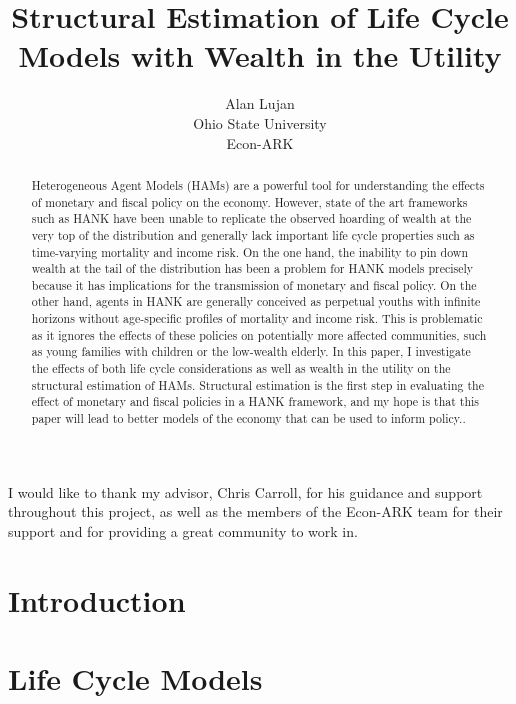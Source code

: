 \documentclass{article}
\title{Structural Estimation of Life Cycle Models with Wealth in the Utility}
\date{\displaydate{articleDate}}
\author{Alan Lujan\footnotemark[1]\\
Ohio State University\\Econ-ARK\\}
\begin{document}
\maketitle
{}

\begin{abstract}
Heterogeneous Agent Models (HAMs) are a powerful tool for understanding the effects of monetary and fiscal policy on the economy. However, state of the art frameworks such as HANK have been unable to replicate the observed hoarding of wealth at the very top of the distribution and generally lack important life cycle properties such as time-varying mortality and income risk. On the one hand, the inability to pin down wealth at the tail of the distribution has been a problem for HANK models precisely because it has implications for the transmission of monetary and fiscal policy. On the other hand, agents in HANK are generally conceived as perpetual youths with infinite horizons without age-specific profiles of mortality and income risk. This is problematic as it ignores the effects of these policies on potentially more affected communities, such as young families with children or the low-wealth elderly. In this paper, I investigate the effects of both life cycle considerations as well as wealth in the utility on the structural estimation of HAMs. Structural estimation is the first step in evaluating the effect of monetary and fiscal policies in a HANK framework, and my hope is that this paper will lead to better models of the economy that can be used to inform policy..
\end{abstract}


I would like to thank my advisor, Chris Carroll, for his guidance and support throughout this project, as well as the members of the Econ-ARK team for their support and for providing a great community to work in.

\section{Introduction}\label{Introduction}

\section{Life Cycle Models}\label{Life Cycle Models}
\end{document}

